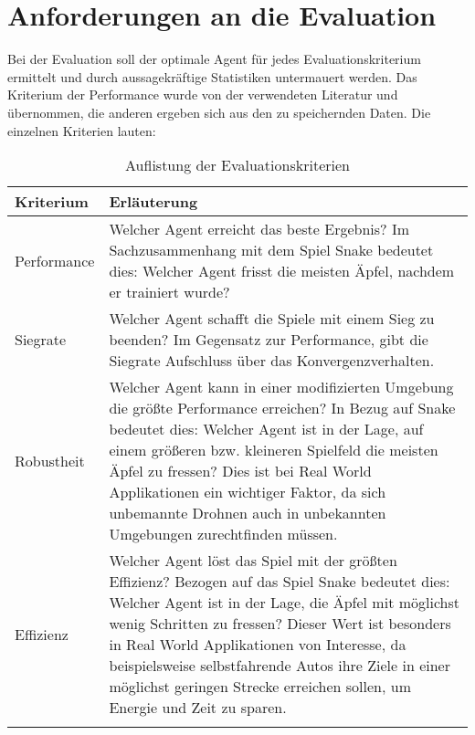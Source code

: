 \section{Anforderungen an die Evaluation} \label{sec:Anforderungen_an_die_Evaluation}
Bei der Evaluation soll der optimale Agent für jedes Evaluationskriterium ermittelt und durch aussagekräftige Statistiken untermauert werden.
Das Kriterium der Performance wurde von der verwendeten Literatur \cite{Autonomous_Agents_in_Snake_Game_via_DRL} und \cite{UAV} übernommen, die anderen ergeben sich aus den zu speichernden Daten.
Die einzelnen Kriterien lauten:
\begin{longtable}[h]{|p{4cm}|p{\linewidth - 5cm}|}
	\hline
	Kriterium & Erläuterung \\
	\hline
	Performance & Welcher Agent erreicht das beste Ergebnis? Im Sachzusammenhang mit dem Spiel Snake bedeutet dies: Welcher Agent frisst die meisten Äpfel, nachdem er trainiert wurde?\\
	\hline
	Siegrate & Welcher Agent schafft die Spiele mit einem Sieg zu beenden? Im Gegensatz zur Performance, gibt die Siegrate Aufschluss über das Konvergenzverhalten.\\
	\hline
	Robustheit & Welcher Agent kann in einer modifizierten Umgebung die größte Performance erreichen? In Bezug auf Snake bedeutet dies: Welcher Agent ist in der Lage, auf einem größeren bzw. kleineren Spielfeld die meisten Äpfel zu fressen? Dies ist bei Real World Applikationen ein wichtiger Faktor, da sich unbemannte Drohnen auch in unbekannten Umgebungen zurechtfinden müssen.\\
	\hline
	Effizienz & Welcher Agent löst das Spiel mit der größten Effizienz? Bezogen auf das Spiel Snake bedeutet dies: Welcher Agent ist in der Lage, die Äpfel mit möglichst wenig Schritten zu fressen? Dieser Wert ist besonders in Real World Applikationen von Interesse, da beispielsweise selbstfahrende Autos ihre Ziele in einer möglichst geringen Strecke erreichen sollen, um Energie und Zeit zu sparen.\\
	\hline
	\caption{Auflistung der Evaluationskriterien}
	\label{tab:Anforderungen_Kriterien} 
\end{longtable}